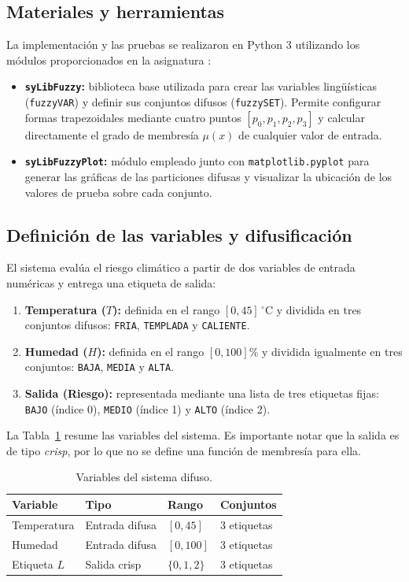 \documentclass[conference]{IEEEtran}
\begin{document}
\subsection{Materiales y herramientas}
La implementación y las pruebas se realizaron en Python 3 utilizando los módulos proporcionados en la asignatura \cite{sanchez2026}:
\begin{itemize}
    \item \textbf{\texttt{syLibFuzzy}:} biblioteca base utilizada para crear las variables lingüísticas (\texttt{fuzzyVAR}) y definir sus conjuntos difusos (\texttt{fuzzySET}). Permite configurar formas trapezoidales mediante cuatro puntos \([p_0, p_1, p_2, p_3]\) y calcular directamente el grado de membresía \(\mu(x)\) de cualquier valor de entrada.
    \item \textbf{\texttt{syLibFuzzyPlot}:} módulo empleado junto con \texttt{matplotlib.pyplot} para generar las gráficas de las particiones difusas y visualizar la ubicación de los valores de prueba sobre cada conjunto.
\end{itemize}

\subsection{Definición de las variables y difusificación}
El sistema evalúa el riesgo climático a partir de dos variables de entrada numéricas y entrega una etiqueta de salida:
\begin{enumerate}
    \item \textbf{Temperatura (\(T\)):} definida en el rango \([0, 45]\,^\circ\)C y dividida en tres conjuntos difusos: \texttt{FRIA}, \texttt{TEMPLADA} y \texttt{CALIENTE}.
    \item \textbf{Humedad (\(H\)):} definida en el rango \([0, 100]\%\) y dividida igualmente en tres conjuntos: \texttt{BAJA}, \texttt{MEDIA} y \texttt{ALTA}.
    \item \textbf{Salida (Riesgo):} representada mediante una lista de tres etiquetas fijas: \texttt{BAJO} (índice 0), \texttt{MEDIO} (índice 1) y \texttt{ALTO} (índice 2).
\end{enumerate}

La Tabla~\ref{tab:variables} resume las variables del sistema. Es importante notar que la salida es de tipo \textit{crisp}, por lo que no se define una función de membresía para ella.

\begin{table}[htbp]
\centering
\caption{Variables del sistema difuso.}
\label{tab:variables}
\begin{tabular}{llll}
\toprule
Variable & Tipo & Rango & Conjuntos \\
\midrule
Temperatura & Entrada difusa & \([0, 45]\) & 3 etiquetas \\
Humedad & Entrada difusa & \([0, 100]\) & 3 etiquetas \\
Etiqueta \(L\) & Salida crisp & \(\{0,1,2\}\) & 3 etiquetas \\
\bottomrule
\end{tabular}
\end{table}
\end{document}

